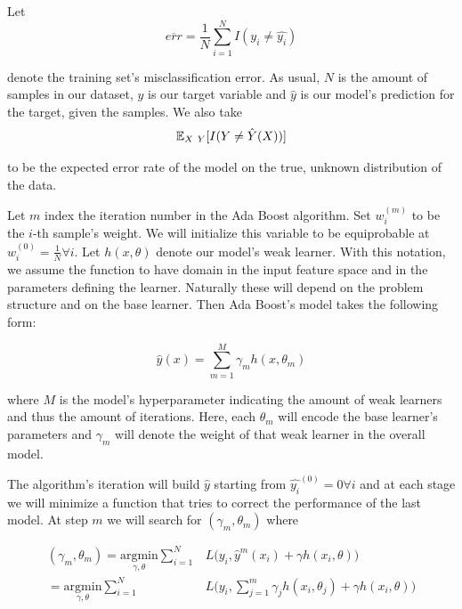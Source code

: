 Let
\begin{equation} \label{equation-adaBoostTrainingError}
\overline{err} = \frac{1}{N} \sum_{i=1}^{N} I(y_i \neq \hat{y_i})
\end{equation}

denote the training set's misclassification error. As usual, $N$ is the amount of samples in our dataset, $y$ is our target variable and $\hat{y}$ is our model's prediction for the target, given the samples. We also take
\begin{equation}
\operatorname{\mathbb{E}}_{X \ Y} [ I(Y \neq \hat{Y}(X)) ]
\end{equation}

to be the expected error rate of the model on the true,  unknown distribution of the data.

Let $m$ index the iteration number in the Ada Boost algorithm. Set $w^{(m)}_i$ to be the $i$-th sample's weight. We will initialize this variable to be equiprobable at $w^{(0)}_i = \frac{1}{N} \forall i$. Let $h(x,\theta)$  denote our model's weak learner. With this notation, we assume the function to have domain in the input feature space and in the parameters defining the learner. Naturally these will depend on the problem structure and on the base learner. Then Ada Boost's model takes the following form:

\begin{equation} \label{equation-adaBoostModel}
\hat{y}(x) = \sum_{m=1}^{M} \gamma_m h(x,\theta_m)
\end{equation}

where $M$ is the model's hyperparameter indicating the amount of weak learners and thus the amount of iterations. Here, each $\theta_m$ will encode the base learner's parameters and $\gamma_m$ will denote the weight of that weak learner in the overall model.

The algorithm's iteration will build $\hat{y}$ starting from $\hat{y_i}^{(0)}= 0 \forall i$ and at each stage we will minimize a function that tries to correct the performance of the last model. At step $m$ we will search for $(\gamma_{m}, \theta_{m})$ where

\begin{equation} \label{equation-adaBoostIteration}
\begin{split}
(\gamma_{m}, \theta_{m}) = \underset{\gamma, \theta}{\mathrm{argmin}}  \sum_{i=1}^{N} & L\big( y_i,   \hat{y}^{m}(x_i) + \gamma h(x_i,\theta) \big) \\
= \underset{\gamma, \theta}{\mathrm{argmin}} \sum_{i=1}^{N}  & L\big( y_i,    \sum_{j=1}^{m} \gamma_j h(x_i,\theta_j) + \gamma h(x_i,\theta) \big)
\end{split}
\end{equation}

